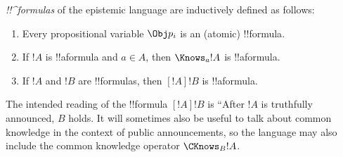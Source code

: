 \documentclass[../../../include/open-logic-section]{subfiles}
\begin{document}
\begin{defn}
\emph{!!^{formula}s} of the epistemic language are inductively
  defined as follows:
\begin{enumerate}


\item Every propositional variable $\Obj p_i$ is an (atomic) !!{formula}.






\item If $!A$ is !!a{formula} and $a \in A$, then $\Knows_a !A$ is
  !!a{formula}.
  
\item If $!A$ and $!B$ are !!{formula}s, then $[!A] !B$ is !!a{formula}.

\end{enumerate}
\end{defn}

The intended reading of the !!{formula} $[!A] !B$ is ``After $!A$ is truthfully announced,
$B$ holds. It will sometimes also be useful to talk about common knowledge in the context
of public announcements, so the language may also include the common knowledge
operator $\CKnows_B !A$.
\end{document}
